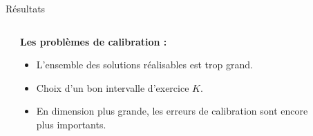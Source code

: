 \documentclass[final]{beamer}
\newlength{\sepwid}
\newlength{\onecolwid}
\newlength{\twocolwid}
\begin{document}
\begin{frame}[t]
\begin{columns}[t]
\begin{column}{\twocolwid}
\begin{block}{Résultats}
\begin{columns}[t,totalwidth=0.45\paperwidth]
\begin{column}{\onecolwid}

\end{column} %

\begin{column}{\onecolwid} %



  \textbf{Les problèmes de calibration :}
  \begin{itemize}
    \item L'ensemble des solutions réalisables est trop grand.
    \item Choix d'un bon intervalle d'exercice $K$.
    \item En dimension plus grande, les erreurs de calibration sont encore plus importants.
  \end{itemize}

\end{column} %

\end{columns} %

\end{block}

\end{column} %

\begin{column}{\sepwid}\end{column} %


\begin{column}{\onecolwid} %



\end{column}
\end{columns}
\end{frame}
\end{document}
